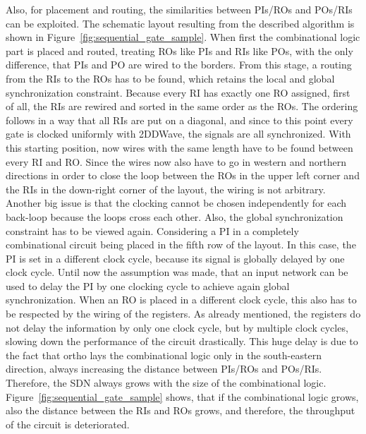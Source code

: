 Also, for placement and routing, the similarities between PIs/ROs and POs/RIs can be exploited. The schematic layout resulting from the described algorithm is shown in Figure~\ref{fig:sequential_gate_sample}. When first the combinational logic part is placed and routed, treating ROs like PIs and RIs like POs, with the only difference, that PIs and PO are wired to the borders. From this stage, a routing from the RIs to the ROs has to be found, which retains the local and global synchronization constraint. Because every RI has exactly one RO assigned, first of all, the RIs are rewired and sorted in the same order as the ROs. The ordering follows in a way that all RIs are put on a diagonal, and since to this point every gate is clocked uniformly with 2DDWave, the signals are all synchronized. With this starting position, now wires with the same length have to be found between every RI and RO. Since the wires now also have to go in western and northern directions in order to close the loop between the ROs in the upper left corner and the RIs in the down-right corner of the layout, the wiring is not arbitrary. Another big issue is that the clocking cannot be chosen independently for each back-loop because the loops cross each other. Also, the global synchronization constraint has to be viewed again. Considering a PI in a completely combinational circuit being placed in the fifth row of the layout. In this case, the PI is set in a different clock cycle, because its signal is globally delayed by one clock cycle. Until now the assumption was made, that an input network can be used to delay the PI by one clocking cycle to achieve again global synchronization. When an RO is placed in a different clock cycle, this also has to be respected by the wiring of the registers. As already mentioned, the registers do not delay the information by only one clock cycle, but by multiple clock cycles, slowing down the performance of the circuit drastically. This huge delay is due to the fact that ortho lays the combinational logic only in the south-eastern direction, always increasing the distance between PIs/ROs and POs/RIs. Therefore, the SDN always grows with the size of the combinational logic. Figure~\ref{fig:sequential_gate_sample} shows, that if the combinational logic grows, also the distance between the RIs and ROs grows, and therefore, the throughput of the circuit is deteriorated.

